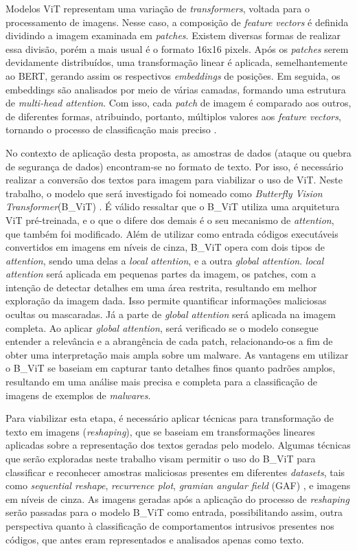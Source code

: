 Modelos ViT representam uma variação de \textit{transformers}, voltada para o processamento de imagens. Nesse caso, a composição de \textit{feature vectors} é definida dividindo a imagem examinada em \textit{patches}. Existem diversas formas de realizar essa divisão, porém a mais usual é o formato 16x16 pixels. Após os \textit{patches} serem devidamente distribuídos, uma transformação linear é aplicada, semelhantemente ao BERT, gerando assim os respectivos \textit{embeddings} de posições. Em seguida, os embeddings são analisados por meio de várias camadas, formando uma estrutura de \textit{multi-head attention}. Com isso, cada \textit{patch} de imagem é comparado aos outros, de diferentes formas, atribuindo, portanto, múltiplos valores aos \textit{feature vectors}, tornando o processo de classificação mais preciso \cite{dosovitskiy2020}.

No contexto de aplicação desta proposta, as amostras de dados (ataque ou quebra de segurança de dados) encontram-se no formato de texto. Por isso, é necessário realizar a conversão dos textos para imagem para viabilizar o uso de ViT. Neste trabalho, o modelo que será investigado foi nomeado como \textit{Butterfly Vision Transformer}(B\_ViT) \cite{belal2023global}. É válido ressaltar que o B\_ViT utiliza uma arquitetura ViT pré-treinada, e o que o difere dos demais é o seu mecanismo de \textit{attention}, que também foi modificado. Além de utilizar como entrada códigos executáveis convertidos em imagens em níveis de cinza, B\_ViT opera com dois tipos de \textit{attention}, sendo uma delas a \textit{local attention}, e a outra \textit{global attention}. \textit{local attention} será aplicada em pequenas partes da imagem, os patches, com a intenção de detectar detalhes em uma área restrita, resultando em melhor exploração da imagem dada. Isso permite quantificar informações maliciosas ocultas ou mascaradas. Já a parte de \textit{global attention} será aplicada na imagem completa. Ao aplicar \textit{global attention}, será verificado se o modelo consegue entender a relevância e a abrangência de cada patch, relacionando-os a fim de obter uma interpretação mais ampla sobre um malware. As vantagens em utilizar o B\_ViT se baseiam em capturar tanto detalhes finos quanto padrões amplos, resultando em uma análise mais precisa e completa para a classificação de imagens de exemplos de \textit{malwares}.

Para viabilizar esta etapa, é necessário aplicar técnicas para transformação de texto em imagens (\textit{reshaping}), que se baseiam em transformações lineares aplicadas sobre a representação dos textos geradas pelo modelo. Algumas técnicas que serão exploradas neste trabalho visam permitir o uso do B\_ViT para classificar e reconhecer amostras maliciosas presentes em diferentes \textit{datasets}, tais como \textit{sequential reshape}, \textit{recurrence plot}, \textit{gramian angular field} (GAF) \cite{terzi2022gramian}, e imagens em níveis de cinza. As imagens geradas após a aplicação do processo de \textit{reshaping} serão passadas para o modelo B\_ViT como entrada, possibilitando assim, outra perspectiva quanto à classificação de comportamentos intrusivos presentes nos códigos, que antes eram representados e analisados apenas como texto.

